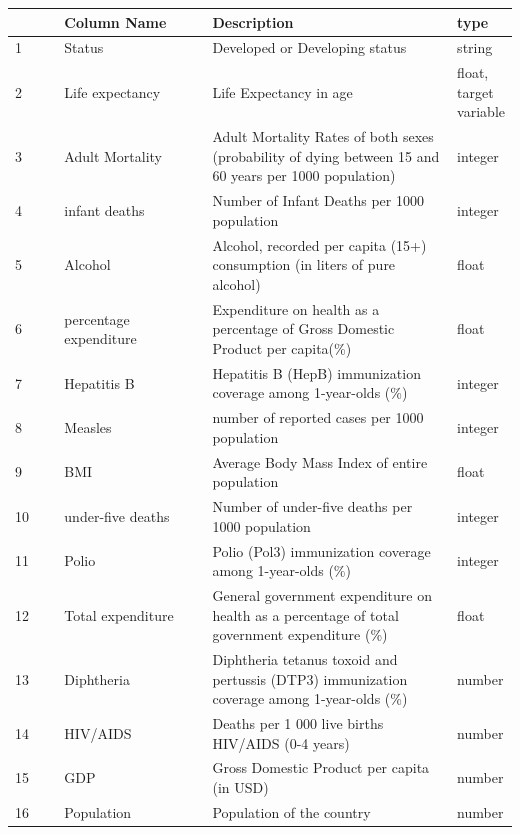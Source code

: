 \begin{table}
  \centering
  \begin{tabular}{@{}p{0.1\linewidth}  p{0.3\linewidth}p{0.5\linewidth}p{0.1\linewidth}@{}}
    \toprule
      & Column Name     & Description                                                             & type \\
    \midrule 
    1 & Status                 & Developed or Developing status                               & string \\
    2 & Life expectancy   & Life Expectancy in age                                             & float, target variable \\
    3 & Adult Mortality    & Adult Mortality Rates of both sexes (probability of dying between 15 and 60 years per 1000 population) & integer \\
    4 & infant deaths      & Number of Infant Deaths per 1000 population & integer \\
    5 & Alcohol              & Alcohol, recorded per capita (15+) consumption (in liters of pure alcohol) & float \\
    6 & percentage expenditure & Expenditure on health as a percentage of Gross Domestic Product per capita(\%) & float \\
    7 & Hepatitis B & Hepatitis B (HepB) immunization coverage among 1-year-olds (\%) & integer \\
    8 & Measles & number of reported cases per 1000 population & integer \\
    9 & BMI & Average Body Mass Index of entire population & float \\
    10 & under-five deaths & Number of under-five deaths per 1000 population & integer \\
    11 & Polio & Polio (Pol3) immunization coverage among 1-year-olds (\%) & integer \\
    12 & Total expenditure & General government expenditure on health as a percentage of total government expenditure (\%) & float \\
    13 & Diphtheria & Diphtheria tetanus toxoid and pertussis (DTP3) immunization coverage among 1-year-olds (\%) & number \\
    14 & HIV/AIDS & Deaths per 1 000 live births HIV/AIDS (0-4 years) & number \\
    15 & GDP & Gross Domestic Product per capita (in USD) & number \\
    16 & Population & Population of the country & number \\

\end{tabular}
\end{table}
